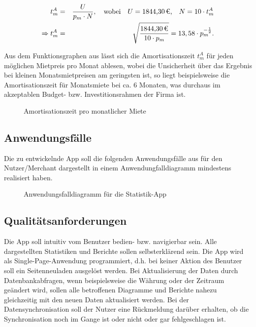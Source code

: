 \begin{eqnarray}
	t^{A}_m &=& \frac{U}{p_m \cdot N},\quad \mbox{wobei}\quad U = \mbox{\eur{1844,30},}\quad N = 10 \cdot t_m^{A}\\
	\Rightarrow t^{A}_m &=& \sqrt{\frac{\eur{1844,30}}{10 \cdot p_m}} = 13,58 \cdot p_m^{-\frac{1}{2}}.
\end{eqnarray}

Aus dem Funktionsgraphen aus  lässt sich die Amortisationszeit $t_m^{A}$ für jeden möglichen Mietpreis pro Monat ablesen, wobei die Unsicherheit über das Ergebnis bei kleinen Monatsmietpreisen am geringsten ist, so liegt beispielsweise die Amortisationszeit für  Monatsmiete bei ca. 6 Monaten, was durchaus im akzeptablen Budget- bzw. Investitionsrahmen der Firma ist.

\begin{figure}[htb]
\centering
{}
\caption{Amortisationszeit pro monatlicher Miete}
\label{fig:AM}
\end{figure}

\subsection{Anwendungsfälle}
\label{sec:Anwendungsfaelle}

Die zu entwickelnde App soll die folgenden Anwendungsfälle aus für den Nutzer/Merchant dargestellt in einem Anwendungfalldiagramm  mindestens 
realisiert haben.
\begin{figure}[htb]
\centering
{}
\caption{Anwendungsfalldiagramm für die Statistik-App}
\label{fig:usecase2}
\end{figure}


\subsection{Qualitätsanforderungen}
\label{sec:Qualitaetsanforderungen}

Die App soll intuitiv vom Benutzer bedien- bzw. navigierbar sein. Alle dargestellten Statistiken und Berichte sollen selbsterklärend sein. Die App wird als Single-Page-Anwendung programmiert, d.h. bei keiner Aktion des Benutzer soll ein Seitenneuladen ausgelöst werden. Bei Aktualisierung der Daten durch Datenbankabfragen, wenn beispielsweise die Währung oder der Zeitraum geändert wird, sollen alle betroffenen Diagramme und Berichte nahezu gleichzeitig mit den neuen Daten aktualisiert werden. Bei der Datensynchronisation soll der Nutzer eine Rückmeldung darüber erhalten, ob die Synchronisation noch im Gange ist oder nicht oder gar fehlgeschlagen ist.

